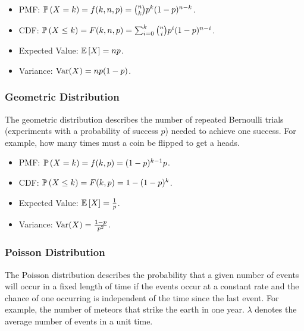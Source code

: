 \documentclass[12pt, titlepage]{article}
\begin{document}
\begin{info}{}
\begin{itemize}
	\item PMF: $\mathbb{P}\left(X = k\right) = f(k, n, p) = {n \choose k} p^k (1-p)^{n-k}$.
	\item CDF: $\mathbb{P}\left(X \leq k\right) = F(k, n, p) = \sum_{i = 0}^k {n \choose i}p^i(1-p)^{n-i}$.
	\item Expected Value: $\mathbb{E}\left[X\right] = np$.
	\item Variance: $\operatorname{Var}(X) = np(1-p)$.
\end{itemize}
\end{info}

\subsubsection{Geometric Distribution}

\begin{rmk}
The geometric distribution describes the number of repeated Bernoulli trials (experiments with a probability of success $p$) needed to achieve one success. For example, how many times must a coin be flipped to get a heads. 
\end{rmk}

\begin{info}{}
	\begin{itemize}
		\item PMF: $\mathbb{P}\left(X = k\right) = f(k, p) = (1-p)^{k-1}p$.
		\item CDF: $\mathbb{P}\left(X \leq k\right) = F(k, p) = 1 - (1 - p)^k$.
		\item Expected Value: $\mathbb{E}\left[X\right] = \frac{1}{p}$.
		\item Variance: $\operatorname{Var}(X) = \frac{1-p}{p^2}$.
	\end{itemize}
\end{info}

\subsubsection{Poisson Distribution}

\begin{rmk}
	The Poisson distribution describes the probability that a given number of events will occur in a fixed length of time if the events occur at a constant rate and the chance of one occurring is independent of the time since the last event. For example, the number of meteors that strike the earth in one year. $\lambda$ denotes the average number of events in a unit time.
\end{rmk}
\end{document}

